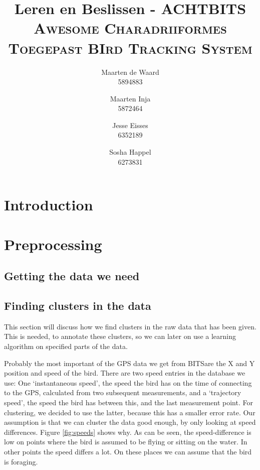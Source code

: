 \documentclass[a4paper,10pt]{article}
\title{Leren en Beslissen - ACHTBITS\\\large \textsc{Awesome Charadriiformes Toegepast
BIrd Tracking System}}
\author{Maarten de Waard\\5894883 \and Maarten Inja \\5872464 \and Jesse Eisses \\
6352189 \and Sosha Happel\\ 6273831}
\newcommand{\bits}{BITS}
\begin{document}
\maketitle
\section{Introduction}

\section{Preprocessing}
 \subsection{Getting the data we need}
 
 \subsection{Finding clusters in the data}
 This section will discuss how we find clusters in the raw data that has been
 given. This is needed, to annotate these clusters, so we can later on use a
 learning algorithm on specified parts of the data.

 Probably the most important of the GPS data we get from \bits are the X and Y
 position and speed of the bird. There are two speed entries in the database we
 use: One `instantaneous speed', the speed the bird has on the time of
 connecting to the GPS, calculated from two subsequent measurements, and a
 `trajectory speed', the speed the bird has between this, and the last
 measurement point. For clustering, we decided to use the latter, because this
 has a smaller error rate. Our assumption is that we can cluster the data good
 enough, by only looking at speed differences. Figure \ref{fig:speeds} shows
 why.
 As can be seen, the speed-difference is low on points where the bird is assumed
 to be flying or sitting on the water. In other points the speed differs a lot.
 On these places we can assume that the bird is foraging.
\end{document}
